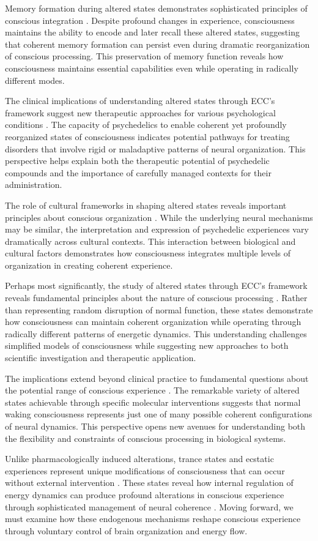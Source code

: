 Memory formation during altered states demonstrates sophisticated principles of conscious integration \cite{Hobson2007}. Despite profound changes in experience, consciousness maintains the ability to encode and later recall these altered states, suggesting that coherent memory formation can persist even during dramatic reorganization of conscious processing. This preservation of memory function reveals how consciousness maintains essential capabilities even while operating in radically different modes.

The clinical implications of understanding altered states through ECC's framework suggest new therapeutic approaches for various psychological conditions \cite{Vollenweider2020}. The capacity of psychedelics to enable coherent yet profoundly reorganized states of consciousness indicates potential pathways for treating disorders that involve rigid or maladaptive patterns of neural organization. This perspective helps explain both the therapeutic potential of psychedelic compounds and the importance of carefully managed contexts for their administration.

The role of cultural frameworks in shaping altered states reveals important principles about conscious organization \cite{Winkelman2010}. While the underlying neural mechanisms may be similar, the interpretation and expression of psychedelic experiences vary dramatically across cultural contexts. This interaction between biological and cultural factors demonstrates how consciousness integrates multiple levels of organization in creating coherent experience.

Perhaps most significantly, the study of altered states through ECC's framework reveals fundamental principles about the nature of conscious processing \cite{Preller2018}. Rather than representing random disruption of normal function, these states demonstrate how consciousness can maintain coherent organization while operating through radically different patterns of energetic dynamics. This understanding challenges simplified models of consciousness while suggesting new approaches to both scientific investigation and therapeutic application.

The implications extend beyond clinical practice to fundamental questions about the potential range of conscious experience \cite{Wulff2014}. The remarkable variety of altered states achievable through specific molecular interventions suggests that normal waking consciousness represents just one of many possible coherent configurations of neural dynamics. This perspective opens new avenues for understanding both the flexibility and constraints of conscious processing in biological systems.

Unlike pharmacologically induced alterations, trance states and ecstatic experiences represent unique modifications of consciousness that can occur without external intervention \cite{Eliade1964}. These states reveal how internal regulation of energy dynamics can produce profound alterations in conscious experience through sophisticated management of neural coherence \cite{Farthing1992}. Moving forward, we must examine how these endogenous mechanisms reshape conscious experience through voluntary control of brain organization and energy flow.